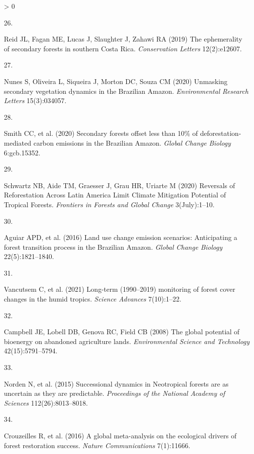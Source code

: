 \documentclass[9pt,twocolumn,twoside,]{pnas-new}
\newlength{\csllabelwidth}
\newlength{\cslhangindent}
\newenvironment{CSLReferences}[2] %
 {%
  \setlength{\parindent}{0pt}
  \ifodd #1 \everypar{\setlength{\hangindent}{\cslhangindent}}\ignorespaces\fi
  \ifnum #2 > 0
  \setlength{\parskip}{#2\baselineskip}
  \fi
 }%
 {}
\newcommand{\CSLLeftMargin}[1]{\parbox[t]{\csllabelwidth}{#1}}
\newcommand{\CSLRightInline}[1]{\parbox[t]{\linewidth - \csllabelwidth}{#1}\break}
\begin{document}
\begin{CSLReferences}{0}{0}
\leavevmode\hypertarget{ref-Reid2019}{}%
\CSLLeftMargin{26. }
\CSLRightInline{Reid JL, Fagan ME, Lucas J, Slaughter J, Zahawi RA
(2019) {The ephemerality of secondary forests in southern Costa Rica}.
\emph{Conservation Letters} 12(2):e12607.}

\leavevmode\hypertarget{ref-Nunes2020}{}%
\CSLLeftMargin{27. }
\CSLRightInline{Nunes S, Oliveira L, Siqueira J, Morton DC, Souza CM
(2020) {Unmasking secondary vegetation dynamics in the Brazilian
Amazon}. \emph{Environmental Research Letters} 15(3):034057.}

\leavevmode\hypertarget{ref-Smith2020}{}%
\CSLLeftMargin{28. }
\CSLRightInline{Smith CC, et al. (2020) {Secondary forests offset less
than 10{\%} of deforestation‐mediated carbon emissions in the Brazilian
Amazon}. \emph{Global Change Biology} 6:gcb.15352.}

\leavevmode\hypertarget{ref-Schwartz2020}{}%
\CSLLeftMargin{29. }
\CSLRightInline{Schwartz NB, Aide TM, Graesser J, Grau HR, Uriarte M
(2020) {Reversals of Reforestation Across Latin America Limit Climate
Mitigation Potential of Tropical Forests}. \emph{Frontiers in Forests
and Global Change} 3(July):1--10.}

\leavevmode\hypertarget{ref-Aguiar2016}{}%
\CSLLeftMargin{30. }
\CSLRightInline{Aguiar APD, et al. (2016) {Land use change emission
scenarios: Anticipating a forest transition process in the Brazilian
Amazon}. \emph{Global Change Biology} 22(5):1821--1840.}

\leavevmode\hypertarget{ref-Vancutsem2021}{}%
\CSLLeftMargin{31. }
\CSLRightInline{Vancutsem C, et al. (2021) {Long-term (1990--2019)
monitoring of forest cover changes in the humid tropics}. \emph{Science
Advances} 7(10):1--22.}

\leavevmode\hypertarget{ref-Campbell2008}{}%
\CSLLeftMargin{32. }
\CSLRightInline{Campbell JE, Lobell DB, Genova RC, Field CB (2008) {The
global potential of bioenergy on abandoned agriculture lands}.
\emph{Environmental Science and Technology} 42(15):5791--5794.}

\leavevmode\hypertarget{ref-Norden2015}{}%
\CSLLeftMargin{33. }
\CSLRightInline{Norden N, et al. (2015) {Successional dynamics in
Neotropical forests are as uncertain as they are predictable}.
\emph{Proceedings of the National Academy of Sciences}
112(26):8013--8018.}

\leavevmode\hypertarget{ref-Crouzeilles2016}{}%
\CSLLeftMargin{34. }
\CSLRightInline{Crouzeilles R, et al. (2016) {A global meta-analysis on
the ecological drivers of forest restoration success}. \emph{Nature
Communications} 7(1):11666.}


\end{CSLReferences}
\end{document}

